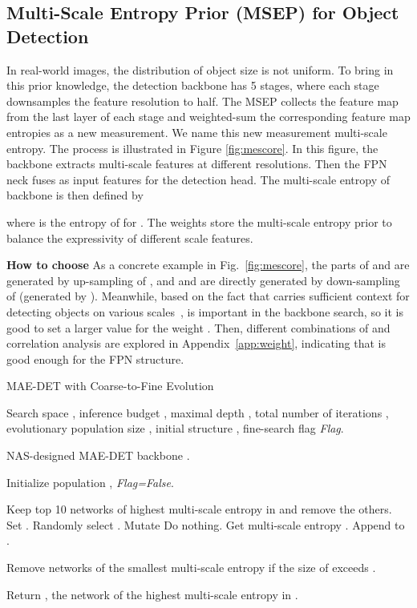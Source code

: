 \documentclass[nohyperref]{article}
\theoremstyle{plain}
\theoremstyle{definition}
\theoremstyle{remark}
\begin{document}
\subsection{Multi-Scale Entropy Prior (MSEP) for Object Detection}\label{sub:msep}
In real-world images, the distribution of object size is not uniform. To bring in this prior knowledge, the detection backbone has 5 stages, where each stage downsamples the feature resolution to half. The MSEP collects the feature map from the last layer of each stage and weighted-sum the corresponding feature map entropies as a new measurement. We name this new measurement multi-scale entropy. The process is illustrated in Figure \ref{fig:mescore}. In this figure, the backbone extracts multi-scale features  at different resolutions. Then the FPN neck fuses  as input features  for the detection head. The multi-scale entropy  of backbone  is then defined by

where  is the entropy of  for . The weights  store the multi-scale entropy prior to balance the expressivity of different scale features. 

\noindent \textbf{How to choose }
As a concrete example in Fig.~\ref{fig:mescore}, the parts of  and  are generated by up-sampling of , and  and  are directly generated by down-sampling of  (generated by ).
Meanwhile, based on the fact that  carries sufficient context for detecting objects on various scales~\citep{yolof},  is important in the backbone search, so it is good to set a larger value for the weight .
Then, different combinations of  and correlation analysis are explored in Appendix~\ref{app:weight}, indicating that  is good enough for the FPN structure.

\begin{algorithm}
	\caption{MAE-DET with Coarse-to-Fine Evolution}
	\label{alg:MAE-DET}
	\begin{algorithmic}[1]
		
		\REQUIRE Search space , inference budget , maximal depth , total number of iterations , evolutionary population size , initial structure , fine-search flag \textit{Flag}.
		
		\ENSURE NAS-designed MAE-DET backbone .
		
		\STATE Initialize population , \textit{Flag=False}.
		
		\FOR{}
		\STATE Keep top 10 networks of highest multi-scale entropy in  and remove the others.
		\STATE Set .
		\ENDIF
		\STATE Randomly select .
		\STATE Mutate 
		\STATE Do nothing.
		\ELSE
		\STATE Get multi-scale entropy .
		\STATE Append  to .
		\ENDIF
		
		\STATE Remove networks of the smallest multi-scale entropy if the size of  exceeds .
		\ENDFOR
		
		\STATE Return , the network of the highest multi-scale entropy in .
		
	\end{algorithmic}
\end{algorithm}
\end{document}
